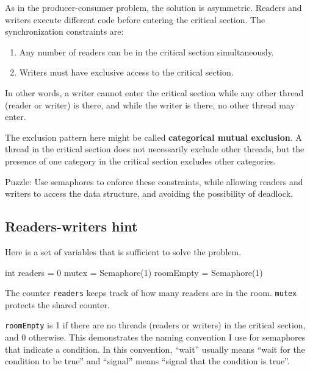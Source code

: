 \documentclass{book}
\begin{document}
As in the producer-consumer problem, the solution is asymmetric.
Readers and writers execute different code before entering the
critical section.  The synchronization constraints are:

\begin{enumerate}

    \item Any number of readers can be in the critical section
          simultaneously.

    \item Writers must have exclusive access to the critical section.

\end{enumerate}

In other words, a writer cannot enter the critical section while
any other thread (reader or writer) is there, and while the writer
is there, no other thread may enter.

The exclusion pattern here might be called {\bf categorical
        mutual exclusion}.  A thread in the critical section
does not necessarily exclude other threads, but the presence
of one category in the critical section excludes other
categories.

Puzzle: Use semaphores to enforce these constraints, while allowing
readers and writers to access the data structure, and avoiding
the possibility of deadlock.



\subsection{Readers-writers hint}

Here is a set of variables that is sufficient to solve the
problem.


\begin{unbreakable}[title={Readers-writers initialization}]{}
int readers = 0
mutex = Semaphore(1)
roomEmpty = Semaphore(1)
\end{unbreakable}

The counter {\tt readers} keeps track of how many readers
are in the room.  {\tt mutex} protects the shared counter.

    {\tt roomEmpty} is 1 if there are no threads (readers or writers) in
the critical section, and 0 otherwise.  This demonstrates the naming
convention I use for semaphores that indicate a condition.  In
this convention, ``wait'' usually means ``wait for the condition to
be true'' and ``signal'' means ``signal that the condition is true''.
\end{document}
